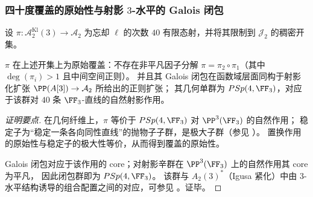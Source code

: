 \subsubsection{四十度覆盖的原始性与射影 \texorpdfstring{$3$}{3}-水平的 Galois 闭包}
设 \(\pi:\mathcal A_{2}^{\mathrm{Kl}}(3)\to\mathcal A_2\) 为忘却 \(\ell\) 的次数 \(40\) 有限态射，并将其限制到 \(\mathcal J_2\) 的稠密开集。

\begin{theorem}\label{thm:xi-40cover-primitive-galois-closure-psp43}
\(\pi\) 在上述开集上为原始覆盖：不存在非平凡因子分解 \(\pi=\pi_2\circ\pi_1\)（其中 \(\deg(\pi_i)>1\) 且中间空间正则）。
并且其 Galois 闭包在函数域层面同构于射影化扩张 \(\PP(A[3])\to \mathcal A_2\) 所给出的正则扩张；
其几何单群为 \(PSp(4,\FF_3)\)，对应于该群对 \(40\) 条 \(\FF_3\)-直线的自然射影作用。
\end{theorem}
\begin{proof}[证明要点]
在几何纤维上，\(\pi\) 等价于 \(PSp(4,\FF_3)\) 对 \(\PP^3(\FF_3)\) 的自然作用；
稳定子为“稳定一条各向同性直线”的抛物子子群，是极大子群（参见 \cite{Conrad2016StandardParabolicSubgroups}）。
置换作用的原始性与稳定子的极大性等价，从而得到覆盖的原始性。
\par
Galois 闭包对应于该作用的 core；对射影辛群在 \(\PP^3(\FF_3)\) 上的自然作用其 core 为平凡，
因此闭包群即为 \(PSp(4,\FF_3)\)。
该群与 \(A_2(3)^\ast\)（Igusa 紧化）中由 \(3\)-水平结构诱导的组合配置之间的对应，可参见 \cite{HoffmanWeintraubSp4F3AbelianSurfaces}。证毕。
\end{proof}

\endinput
